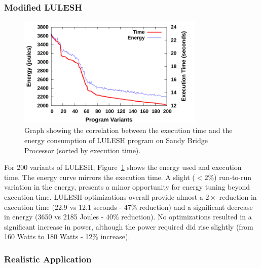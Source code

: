 \subsubsection{Modified LULESH}

\begin{figure}[bt]
    \includegraphics[width=3.5in]{lulesh-correlation}
    \caption{Graph showing the correlation between the execution time and the 
energy consumption of LULESH program on Sandy Bridge Processor (sorted by execution 
time).}    
    \label{fig:lulesh-correlation}
\end{figure}

For 200 variants of LULESH, Figure~\ref{fig:lulesh-correlation} shows the energy used and 
execution time. The energy curve mirrors the execution time. A slight ($<2\%$)
run-to-run variation in the energy, presents a minor
opportunity for energy tuning beyond execution time. LULESH optimizations 
overall provide almost a $2\times$ reduction in execution time 
(22.9 vs 12.1 seconds - 47\% reduction) and a significant decrease in energy (3650 vs 2185 Joules - 40\% reduction).
No optimizations resulted in a significant increase in power, although the power
required did rise slightly (from 160 Watts to 180 Watts - 12\% increase).

\subsubsection{Realistic Application}

